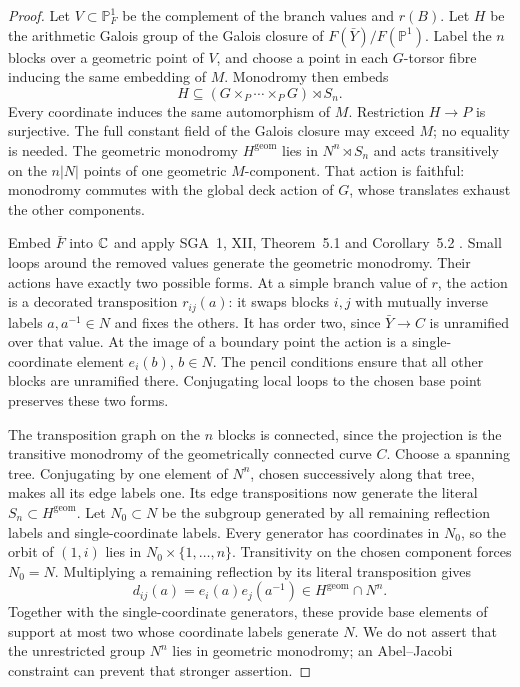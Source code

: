\begin{proof}
Let $V\subset\mathbb P^1_F$ be the complement of the branch
values and $r(B)$. Let $H$ be the arithmetic Galois group of the
Galois closure of $F(\bar Y)/F(\mathbb P^1)$. Label the $n$
blocks over a geometric point of $V$, and choose a point in each
$G$-torsor fibre inducing the same embedding of $M$. Monodromy
then embeds
\begin{equation}\label{eq:F24:wreath_embedding}
 H\subseteq (G\times_P\cdots\times_PG)\rtimes S_n.
\end{equation}
Every coordinate induces the same automorphism of $M$.
Restriction $H\to P$ is surjective. The full constant field of
the Galois closure may exceed $M$; no equality is needed.
The geometric monodromy $H^{\mathrm{geom}}$ lies in
$N^n\rtimes S_n$ and acts transitively on the $n|N|$ points
of one geometric $M$-component. That action is faithful:
monodromy commutes with the global deck action of $G$, whose
translates exhaust the other components.

Embed $\bar F$ into $\mathbb C$ and apply SGA~1, XII, Theorem~5.1
and Corollary~5.2 \citep{F_SGA1}. Small loops around the
removed values generate the geometric monodromy. Their actions
have exactly two possible forms. At a simple branch value of
$r$, the action is a decorated transposition $r_{ij}(a)$:
it swaps blocks $i,j$ with mutually inverse labels
$a,a^{-1}\in N$ and fixes the others. It has order two,
since $\bar Y\to C$ is unramified over that value.
At the image of a boundary point the action is a
single-coordinate element $e_i(b)$, $b\in N$.
The pencil conditions ensure that all other blocks are
unramified there. Conjugating local loops to the chosen base
point preserves these two forms.

The transposition graph on the $n$ blocks is connected, since
the projection is the transitive monodromy of the geometrically
connected curve $C$. Choose a spanning tree. Conjugating by
one element of $N^n$, chosen successively along that tree,
makes all its edge labels one. Its edge transpositions now
generate the literal $S_n\subset H^{\mathrm{geom}}$.
Let $N_0\subset N$ be the subgroup generated by all remaining
reflection labels and single-coordinate labels. Every generator
has coordinates in $N_0$, so the orbit of $(1,i)$ lies in
$N_0\times\{1,\ldots,n\}$. Transitivity on the chosen
component forces $N_0=N$. Multiplying a remaining reflection
by its literal transposition gives
\[
 d_{ij}(a)=e_i(a)e_j(a^{-1})
          \in H^{\mathrm{geom}}\cap N^n.
\]
Together with the single-coordinate generators, these provide
base elements of support at most two whose coordinate labels
generate $N$. We do not assert that the unrestricted group
$N^n$ lies in geometric monodromy; an Abel--Jacobi constraint
can prevent that stronger assertion.


\end{proof}
